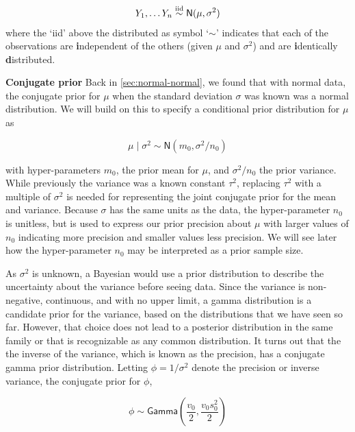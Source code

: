 \documentclass[]{book}
\theoremstyle{definition}
\theoremstyle{definition}
\theoremstyle{definition}
\theoremstyle{remark}
\begin{document}
\[\begin{aligned}
Y_1, \ldots Y_n  \mathrel{\mathop{\sim}\limits^{\rm iid}}
\textsf{N}(\mu, \sigma^2) 
\end{aligned}\] where the `iid' above the distributed as symbol
`\(\sim\)' indicates that each of the observations are
\textbf{i}ndependent of the others (given \(\mu\) and \(\sigma^2\)) and
are \textbf{i}dentically \textbf{d}istributed.

\textbf{Conjugate prior} Back in \ref{sec:normal-normal}, we found that
with normal data, the conjugate prior for \(\mu\) when the standard
deviation \(\sigma\) was known was a normal distribution. We will build
on this to specify a conditional prior distribution for \(\mu\) as

\begin{equation}
\mu \mid \sigma^2   \sim  \textsf{N}(m_0, \sigma^2/n_0)
\label{eq:04-conjugate-normal}
\end{equation}

with hyper-parameters \(m_0\), the prior mean for \(\mu\), and
\(\sigma^2/n_0\) the prior variance. While previously the variance was a
known constant \(\tau^2\), replacing \(\tau^2\) with a multiple of
\(\sigma^2\) is needed for representing the joint conjugate prior for
the mean and variance. Because \(\sigma\) has the same units as the
data, the hyper-parameter \(n_0\) is unitless, but is used to express
our prior precision about \(\mu\) with larger values of \(n_0\)
indicating more precision and smaller values less precision. We will see
later how the hyper-parameter \(n_0\) may be interpreted as a prior
sample size.

As \(\sigma^2\) is unknown, a Bayesian would use a prior distribution to
describe the uncertainty about the variance before seeing data. Since
the variance is non-negative, continuous, and with no upper limit, a
gamma distribution is a candidate prior for the variance, based on the
distributions that we have seen so far. However, that choice does not
lead to a posterior distribution in the same family or that is
recognizable as any common distribution. It turns out that the the
inverse of the variance, which is known as the precision, has a
conjugate gamma prior distribution. Letting \(\phi = 1/\sigma^2\) denote
the precision or inverse variance, the conjugate prior for \(\phi\),

\begin{equation}
\phi \sim \textsf{Gamma}\left(\frac{v_0}{2}, \frac{v_0 s^2_0}{2} \right)
\label{eq:04-conjugate-gamma}
\end{equation}
\end{document}
